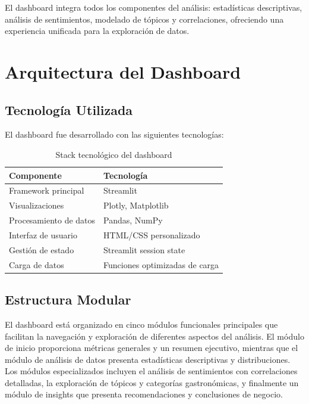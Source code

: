 \documentclass[12pt,a4paper,twoside,openany]{book}
\begin{document}
El dashboard integra todos los componentes del análisis: estadísticas descriptivas, análisis de sentimientos, modelado de tópicos y correlaciones, ofreciendo una experiencia unificada para la exploración de datos.

\section{Arquitectura del Dashboard}

\subsection{Tecnología Utilizada}

El dashboard fue desarrollado con las siguientes tecnologías:

\begin{table}[H]
\centering
\caption{Stack tecnológico del dashboard}
\begin{tabular}{@{}ll@{}}
\toprule
\textbf{Componente} & \textbf{Tecnología} \\
\midrule
Framework principal & Streamlit \\
Visualizaciones & Plotly, Matplotlib \\
Procesamiento de datos & Pandas, NumPy \\
Interfaz de usuario & HTML/CSS personalizado \\
Gestión de estado & Streamlit session state \\
Carga de datos & Funciones optimizadas de carga \\
\bottomrule
\end{tabular}
\end{table}

\subsection{Estructura Modular}

El dashboard está organizado en cinco módulos funcionales principales que facilitan la navegación y exploración de diferentes aspectos del análisis. El módulo de inicio proporciona métricas generales y un resumen ejecutivo, mientras que el módulo de análisis de datos presenta estadísticas descriptivas y distribuciones. Los módulos especializados incluyen el análisis de sentimientos con correlaciones detalladas, la exploración de tópicos y categorías gastronómicas, y finalmente un módulo de insights que presenta recomendaciones y conclusiones de negocio.
\end{document}
